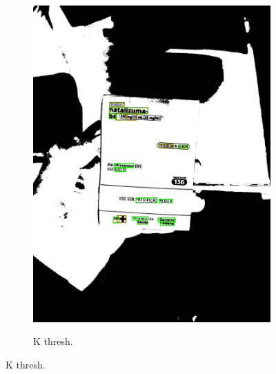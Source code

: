 \begin{figure}[htb]
\begin{subfigure}[t]{0.21\textwidth}
        \includegraphics[width=\linewidth]{../pictures/tysabri_cmyk_y_only_thresh_boxes.jpg}
    \end{subfigure}
    \hfill
    \begin{subfigure}[t]{0.21\textwidth}
        \centering
        \caption{K thresh.}
        \label{fig:foto:versoes:2:K_thresh:boxes}

\end{subfigure}
\end{figure}
